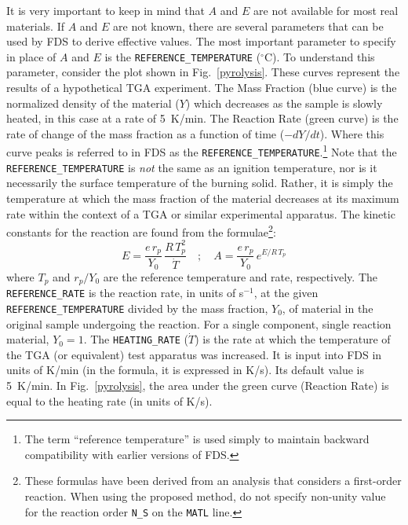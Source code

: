 \documentclass[11pt]{book}
\newcommand{\ct}{\tt\small}
\newcommand{\be}{\begin{equation}}
\newcommand{\ee}{\end{equation}}
\begin{document}
It is very important to keep in mind that $A$ and $E$ are not available for most real materials. If $A$ and $E$ are not known,
there are several parameters that can be used by FDS to derive effective values. The most important parameter to
specify in place of $A$ and $E$ is
the  {\ct REFERENCE\_TEMPERATURE} ($^\circ$C). To understand this parameter, consider the plot shown in Fig.~\ref{pyrolysis}.
These curves represent the results of a hypothetical TGA experiment.
The Mass Fraction (blue curve) is the normalized density of the material ($Y$) which decreases as the sample is slowly heated,
in this case at a rate
of 5~K/min. The Reaction Rate (green curve) is the rate of change of the mass fraction as a function of time ($-dY/dt$).
Where this curve peaks is referred to in FDS
as the {\ct REFERENCE\_TEMPERATURE}.\footnote{The term ``reference temperature'' is used simply to maintain
backward compatibility with earlier versions of
FDS.}  Note that the {\ct REFERENCE\_TEMPERATURE} is {\em not} the same as an ignition temperature, nor is it necessarily
the surface temperature of the burning solid. Rather, it is simply the temperature at which the mass fraction of the material
decreases at its maximum rate within the context of a TGA or similar experimental apparatus. The
kinetic constants for the reaction are found from the formulae\footnote{These formulas have been derived from an analysis that considers a first-order reaction. When using the proposed method,
do not specify non-unity value for the reaction order {\ct N\_S} on the {\ct MATL} line.}:
\be
   E = \frac{e \, r_p}{Y_0} \, \frac{R \, T_p^2}{\dot{T}} \quad ; \quad
   A = \frac{e \, r_p}{Y_0} \, e^{E/R \, T_p} \label{AandE}
\ee
where $T_p$ and $r_p/Y_0$ are the reference temperature and rate, respectively. The
{\ct REFERENCE\_RATE} is the reaction rate, in units of s$^{-1}$, at the given {\ct REFERENCE\_TEMPERATURE} divided by
the mass fraction, $Y_0$, of material in the original sample undergoing the reaction. For a single component, single
reaction material, $Y_0=1$. The {\ct HEATING\_RATE} ($\dot{T}$) is
the rate at which the temperature of the TGA (or equivalent) test
apparatus was increased. It is input into FDS in units of K/min (in the formula, it is expressed in K/s).
Its default value is 5~K/min. In Fig.~\ref{pyrolysis}, the area under the green curve
(Reaction Rate) is equal to the heating rate (in units of K/s).
\end{document}
